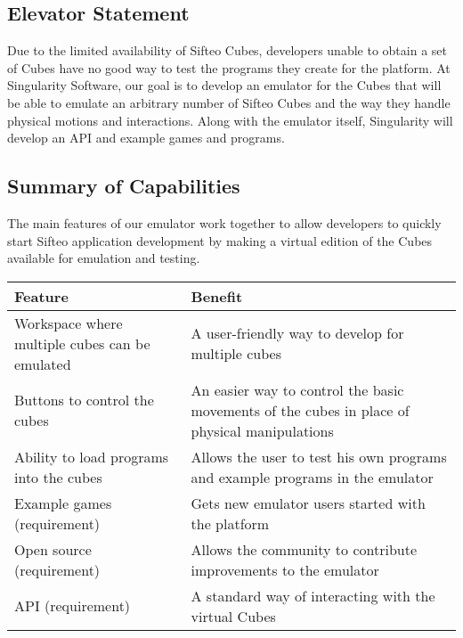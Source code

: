 \documentclass[12pt]{article}
\begin{document}
              \subsection{Elevator Statement}
              Due to the limited availability of Sifteo Cubes, developers unable to obtain a set of Cubes have no good way to test the programs they create for the platform. At Singularity Software, our goal is to develop an emulator for the Cubes that will be able to emulate an arbitrary number of Sifteo Cubes and the way they handle physical motions and interactions. Along with the emulator itself, Singularity will develop an API and example games and programs.
\clearpage
              \subsection{Summary of Capabilities}
              The main features of our emulator work together to allow developers to quickly start Sifteo application development by making a virtual edition of the Cubes available for emulation and testing.
              \begin{table}[h]
                \begin{tabular}{p{3in} | p{3in}}
                  \textbf{Feature} & \textbf{Benefit} \\ \hline
                  Workspace where multiple cubes can be emulated
                            & A user-friendly way to develop for multiple cubes \\ \hline
                  Buttons to control the cubes
                            & An easier way to control the basic movements of the cubes in place of physical manipulations \\ \hline
                  Ability to load programs into the cubes
                            & Allows the user to test his own programs and example programs in the emulator \\ \hline
                  Example games (requirement)
                            & Gets new emulator users started with the platform \\ \hline
                  Open source\index{Open source}  (requirement)
                            & Allows the community to contribute improvements to the emulator \\ \hline
                  API\index{API} (requirement)
                            & A standard way of interacting with the virtual Cubes
                \end{tabular}
              \end{table}
\end{document}
